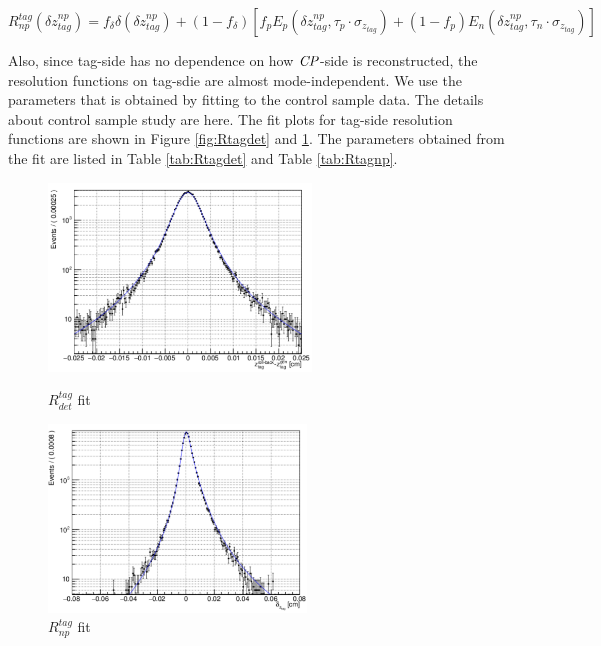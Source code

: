 \begin{equation}\label{eq:Rnp}
R_{np}^{tag}(\delta z_{tag}^{np})=f_{\delta}\delta(\delta z_{tag}^{np}) + 
(1-f_{\delta})[f_p E_p(\delta z_{tag}^{np},\tau_p\cdot \sigma_{z_{tag}}) +
(1-f_p)E_n(\delta z_{tag}^{np},\tau_n\cdot \sigma_{z_{tag}}) ]
\end{equation} 


Also, since tag-side has no dependence on how $\it{CP}$-side is reconstructed, the resolution functions on tag-sdie are almost mode-independent. We use the parameters that is obtained by fitting to the control sample data. The details about control sample study are here\cite{jpsiks_ichep}. The fit plots for tag-side resolution functions are shown in Figure \ref{fig:Rtagdet} and \ref{fig:Rtagnp}. The parameters obtained from the fit are listed in Table \ref{tab:Rtagdet} and Table \ref{tab:Rtagnp}.


\begin{figure}[H]
	\begin{minipage}[b]{0.5\linewidth}
		\centering
		\includegraphics[height=5cm]{figures/Rdet}
		\caption{$R_{det}^{tag} $ fit}
		\label{fig:Rtagdet}
	\end{minipage}
	\begin{minipage}[b]{0.5\linewidth}
		\centering
		\includegraphics[height=5cm]{figures/Rnp}
		\caption{$R_{np}^{tag}$ fit}
		\label{fig:Rtagnp}
	\end{minipage}
\end{figure}

